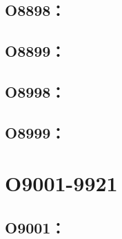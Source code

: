 \subsection{O8898：}



\subsection{O8899：}



\clearpage
\subsection{O8998：}



\subsection{O8999：}




\clearpage
\section{O9001-9921}


\subsection{O9001：}



